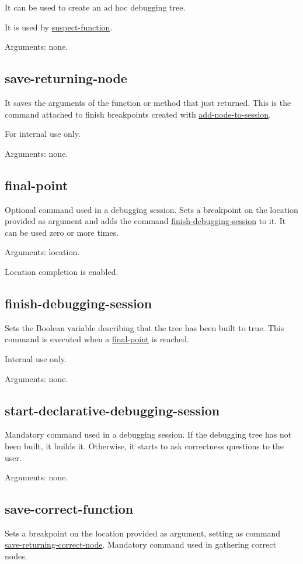 It can be used to create an ad hoc debugging tree.

It is used by \hyperref[command:suspect-function]{suspect-function}.

Arguments: none.
\subsection{save-returning-node}
\label{command:save-returning-node}
It saves the arguments of the function or method that just returned.
This is the command attached to finish breakpoints created with \hyperref[command:add-node-to-session]{add-node-to-session}.

For internal use only.

Arguments: none.
\subsection{final-point}
\label{command:final-point}
Optional command used in a debugging session.
Sets a breakpoint on the location provided as argument and adds the command \hyperref[command:finish-debugging-session]{finish-debugging-session} to it.
It can be used zero or more times.

Arguments: location.

Location completion is enabled.
\subsection{finish-debugging-session}
\label{command:finish-debugging-session}
Sets the Boolean variable describing that the tree has been built to true.
This command is executed when a \hyperref[command:final-point]{final-point} is reached.

Internal use only.

Arguments: none.
\subsection{start-declarative-debugging-session}
\label{command:start-declarative-debugging-session}
Mandatory command used in a debugging session.
If the debugging tree has not been built, it builds it. Otherwise, it starts to ask correctness questions to the user. 

Arguments: none.
\subsection{save-correct-function}
\label{command:save-correct-function}
Sets a breakpoint on the location provided as argument, setting as command \hyperref[command:save-returning-correct-node]{save-returning-correct-node}. Mandatory command used in gathering correct nodes.

